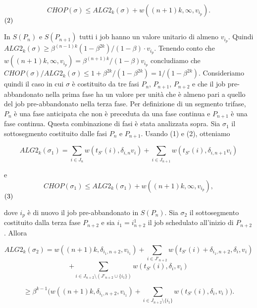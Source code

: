 \documentclass[12pt]{article}
\begin{document}
$$CHOP (\sigma) \leq ALG2_{k} (\sigma) + w((n + 1) k, \infty, v_{i_{p}}).$$ $\hfill (2)$

In $S(P_{n})$ e $S(P_{n+1})$ tutti i job hanno un valore unitario di almeno $v_{i_{p}}$. Quindi $ALG2_{k} (\sigma) \geq \beta^{(n - 1)k}(1 - \beta^{2k}) / (1 - \beta) \cdot v_{i_{p}}$. Tenendo conto che $w ((n +1) k, \infty, v_{i_{p}}) = \beta^{(n + 1) k} / (1 - \beta) v_{i_{p}}$ concludiamo che $CHOP(\sigma) / ALG2_{k}(\sigma) \leq 1 + \beta^{2k} / (1 - \beta^{2k}) = 1 / (1 - \beta^{2k})$.
Consideriamo quindi il caso in cui $\sigma$ è costituito da tre fasi $P_{n}$, $P_{n+1}$, $P_{n+2}$ e che il job pre-abbandonato nella prima fase ha un valore per unità che è almeno pari a quello del job pre-abbandonato nella terza fase. Per definizione di un segmento trifase, $P_{n}$ è una fase anticipata che non è preceduta da una fase continua e $P_{n+1}$ è una fase continua. Questa combinazione di fasi è stata analizzata sopra. Sia $\sigma_{1}$ il sottosegmento costituito dalle fasi $P_{n}$ e $P_{n+1}$. Usando (1) e (2), otteniamo

$$ALG2_{k} (\sigma_{1}) = \sum_{i \in J_{n}} w(t_{S'}(i), \delta_{i, n}v_{i}) + \sum_{i\in J_{n+1}} w (t_{S'}(i), \delta_{i, n + 1} v_{i})$$

e
$$CHOP (\sigma_{1}) \leq ALG2_{k} (\sigma_{1}) + w ((n + 1) k, \infty, v_{i_{p}}),$$ $\hfill (3)$

dove $i_{p}$ è di nuovo il job pre-abbandonato in $S (P_{n})$.
Sia $\sigma_{2}$ il sottosegmento costituito dalla terza fase $P_{n+2}$ e sia $i_{1} = i^{1}_{n+2}$ il job schedulato all'inizio di $P_{n+2}$. Allora

$$ALG2_{k} (\sigma_{2}) = w ((n + 1) k, \delta_{i_{1}, n + 2}, v_{i_{1}}) + \sum_{i \in J'_{n+2}} w(t_{S'}(i) + \delta_{i_{1}, n+2}, \delta_{i}, v_{i})$$
$$+ \sum_{i \in J_{n + 2} \setminus (J'_{n + 2} \cup \{i_{1}\})} w(t_{S'}(i), \delta_{i}, v_{i})$$

$$\geq \beta^{k - 1}\Bigg( w((n + 1) k, \delta_{i_{1},n+2}, v_{i_{1}}) + \sum_{i \in J_{n + 2} \setminus \{i_{1}\}} w(t_{S'}(i), \delta_{i}, v_{i}) \Bigg).$$
\end{document}
